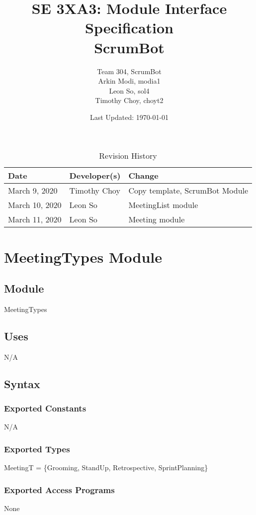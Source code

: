 \documentclass[12pt, titlepage]{article}
\title{SE 3XA3: Module Interface Specification\\ScrumBot}
\author{
    Team 304, ScrumBot
        \\ Arkin Modi, modia1
        \\ Leon So, sol4
        \\ Timothy Choy, choyt2
}
\date{Last Updated: \today}
\begin{document}
\maketitle

\begin{table}[H]
    \caption{Revision History} \label{TblRevisionHistory}
    \begin{tabularx}{\textwidth}{llX}
        \toprule
            \textbf{Date} & \textbf{Developer(s)} & \textbf{Change}\\
        \midrule
            March 9, 2020 & Timothy Choy & Copy template, ScrumBot Module\\
            March 10, 2020 & Leon So & MeetingList module\\
            March 11, 2020 & Leon So & Meeting module\\
        \bottomrule
    \end{tabularx}
\end{table}

\newpage

\section* {MeetingTypes Module}

\subsection* {Module}
MeetingTypes

\subsection*{Uses}
N/A

\subsection*{Syntax}
\subsubsection*{Exported Constants}
N/A
\subsubsection*{Exported Types}
MeetingT = \{Grooming, StandUp, Retrospective, SprintPlanning\}
\subsubsection*{Exported Access Programs}
None
\end{document}
